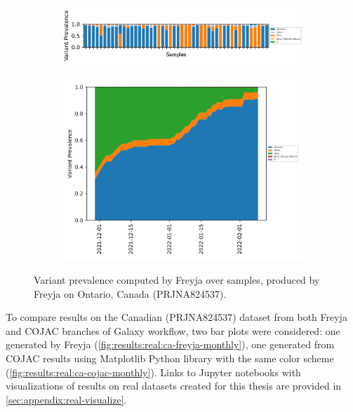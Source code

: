     \begin{figure}[ht!]
        \centering
        \begin{subfigure}[b]{1\textwidth}
        \includegraphics[width=1\textwidth]{figures/results/real/ca-freyja-samples.png}
        \label{fig:results:real:ca-freyja-samples}
        \end{subfigure}
        \hfill
        \begin{subfigure}[b]{0.8\textwidth}
        \includegraphics[width=1\textwidth]{figures/results/real/ca-freyja-daily.jpg}
        \label{fig:results:real:ca-freyja-daily}
        \end{subfigure}
        \hfill
        \caption{Variant prevalence computed by Freyja over samples, produced by Freyja on Ontario, Canada (PRJNA824537).}
    \end{figure}
    
    To compare results on the Canadian (PRJNA824537) dataset from both Freyja and COJAC branches of Galaxy workflow, two bar plots were considered: one generated by Freyja (\cref{fig:results:real:ca-freyja-monthly}), one generated from COJAC results using Matplotlib Python library with the same color scheme (\cref{fig:results:real:ca-cojac-monthly}). Links to Jupyter notebooks with visualizations of results on real datasets created for this thesis are provided in \cref{sec:appendix:real-visualize}.
    
